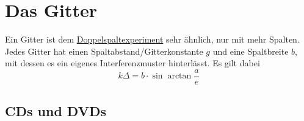 \documentclass{article}
\begin{document}
\section{Das Gitter}
Ein Gitter ist dem \hyperref[Das Doppelspaltexperiment]{Doppelspaltexperiment} sehr ähnlich, nur mit mehr Spalten. Jedes Gitter hat einen Spaltabstand/Gitterkonstante $g$ und eine Spaltbreite $b$, mit dessen es ein eigenes Interferenzmuster hinterlässt. Es gilt dabei
\[
 k \Delta = b \cdot \sin{\arctan{\frac{a}{e}}}
\] %
 
\subsection{CDs und DVDs} 
\end{document}
